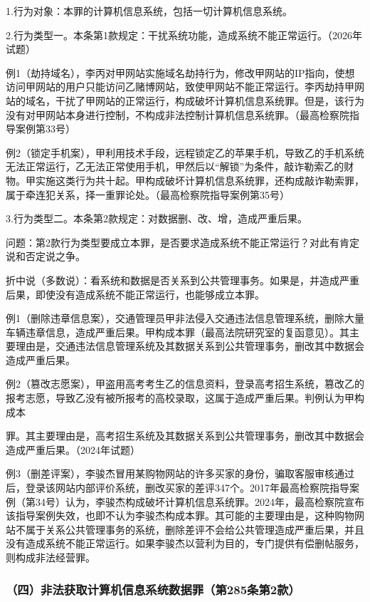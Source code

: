 1.行为对象：本罪的计算机信息系统，包括一切计算机信息系统。

2.行为类型一。本条第1款规定：干扰系统功能，造成系统不能正常运行。（2026年试题）

例1（劫持域名），李丙对甲网站实施域名劫持行为，修改甲网站的IP指向，使想访问甲网站的用户只能访问乙赌博网站，致使甲网站不能正常运行。李丙劫持甲网站的域名，干扰了甲网站的正常运行，构成破坏计算机信息系统罪。但是，该行为没有对甲网站本身进行控制，不构成非法控制计算机信息系统罪。（最高检察院指导案例第33号）

例2（锁定手机案），甲利用技术手段，远程锁定乙的苹果手机，导致乙的手机系统无法正常运行，乙无法正常使用手机，甲然后以“解锁”为条件，敲诈勒索乙的财物。甲实施这类行为共十起。甲构成破坏计算机信息系统罪，还构成敲诈勒索罪，属于牵连犯关系，择一重罪论处。（最高检察院指导案例第35号）

3.行为类型二。本条第2款规定：对数据删、改、增，造成严重后果。

问题：第2款行为类型要成立本罪，是否要求造成系统不能正常运行？对此有肯定说和否定说之争。

折中说（多数说）：看系统和数据是否关系到公共管理事务。如果是，并造成严重后果，即使没有造成系统不能正常运行，也能够成立本罪。

例1（删除违章信息案），交通管理员甲非法侵入交通违法信息管理系统，删除大量车辆违章信息，造成严重后果。甲构成本罪（最高法院研究室的复函意见）。其主要理由是，交通违法信息管理系统及其数据关系到公共管理事务，删改其中数据会造成严重后果。

例2（篡改志愿案），甲盗用高考考生乙的信息资料，登录高考招生系统，篡改乙的报考志愿，导致乙没有被所报考的高校录取，这属于造成严重后果。判例认为甲构成本

罪。其主要理由是，高考招生系统及其数据关系到公共管理事务，删改其中数据会造成严重后果。（2024年试题）

例3（删差评案），李骏杰冒用某购物网站的许多买家的身份，骗取客服审核通过后，登录该网站内部评价系统，删改买家的差评347个。2017年最高检察院指导案例（第34号）认为，李骏杰构成破坏计算机信息系统罪。2024年，最高检察院宣布该指导案例失效，也即不认为李骏杰构成本罪。其可能的主要理由是，这种购物网站不属于关系公共管理事务的系统，删除差评不会给公共管理造成严重后果，并且没有造成系统不能正常运行。如果李骏杰以营利为目的，专门提供有偿删帖服务，则构成非法经营罪。

\subsubsection*{（四）非法获取计算机信息系统数据罪（第285条第2款）}

